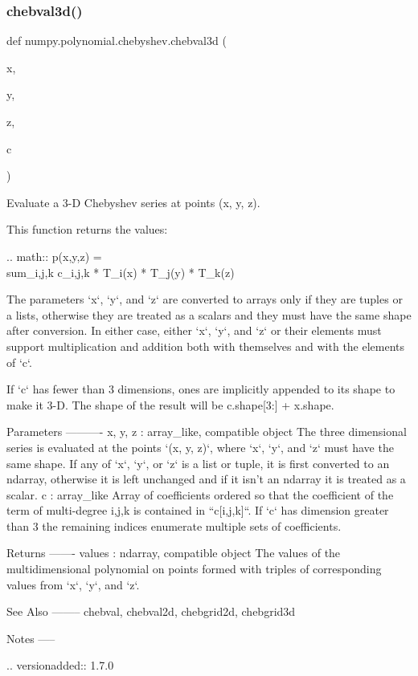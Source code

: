 \subsubsection{\texorpdfstring{chebval3d()}{chebval3d()}}
{\footnotesize\ttfamily def numpy.\+polynomial.\+chebyshev.\+chebval3d (\begin{DoxyParamCaption}\item[{}]{x,  }\item[{}]{y,  }\item[{}]{z,  }\item[{}]{c }\end{DoxyParamCaption})}

\begin{DoxyVerb}Evaluate a 3-D Chebyshev series at points (x, y, z).

This function returns the values:

.. math:: p(x,y,z) = \\sum_{i,j,k} c_{i,j,k} * T_i(x) * T_j(y) * T_k(z)

The parameters `x`, `y`, and `z` are converted to arrays only if
they are tuples or a lists, otherwise they are treated as a scalars and
they must have the same shape after conversion. In either case, either
`x`, `y`, and `z` or their elements must support multiplication and
addition both with themselves and with the elements of `c`.

If `c` has fewer than 3 dimensions, ones are implicitly appended to its
shape to make it 3-D. The shape of the result will be c.shape[3:] +
x.shape.

Parameters
----------
x, y, z : array_like, compatible object
    The three dimensional series is evaluated at the points
    `(x, y, z)`, where `x`, `y`, and `z` must have the same shape.  If
    any of `x`, `y`, or `z` is a list or tuple, it is first converted
    to an ndarray, otherwise it is left unchanged and if it isn't an
    ndarray it is  treated as a scalar.
c : array_like
    Array of coefficients ordered so that the coefficient of the term of
    multi-degree i,j,k is contained in ``c[i,j,k]``. If `c` has dimension
    greater than 3 the remaining indices enumerate multiple sets of
    coefficients.

Returns
-------
values : ndarray, compatible object
    The values of the multidimensional polynomial on points formed with
    triples of corresponding values from `x`, `y`, and `z`.

See Also
--------
chebval, chebval2d, chebgrid2d, chebgrid3d

Notes
-----

.. versionadded:: 1.7.0\end{DoxyVerb}
 \mbox{\label{namespacenumpy_1_1polynomial_1_1chebyshev_a828f268d8b8eb17c66ea6da3c94cebc4}} 
